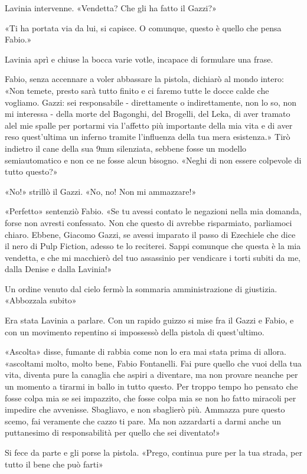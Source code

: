 Lavinia intervenne. «Vendetta? Che gli ha fatto il Gazzi?»

«Ti ha portata via da lui, si capisce. O comunque, questo è quello che pensa Fabio.» 

Lavinia aprì e chiuse la bocca varie votle, incapace di formulare una frase.

Fabio, senza accennare a voler abbassare la pistola, dichiarò al mondo intero: «Non temete, presto sarà tutto finito e ci faremo tutte le docce calde che vogliamo. Gazzi: sei responsabile - direttamente o indirettamente, non lo so, non mi interessa - della morte del Bagonghi, del Brogelli, del Leka, di aver tramato alel mie spalle per portarmi via l'affetto più importante della mia vita e di aver reso quest'ultima un inferno tramite l'influenza della tua mera esistenza.» Tirò indietro il cane della sua 9mm silenziata, sebbene fosse un modello semiautomatico e non ce ne fosse alcun bisogno. «Neghi di non essere colpevole di tutto questo?»

«No!» strillò il Gazzi. «No, no! Non mi ammazzare!»

«Perfetto» sentenziò Fabio. «Se tu avessi contato le negazioni nella mia domanda, forse non avresti confessato. Non che questo di avrebbe risparmiato, parliamoci chiaro. Ebbene, Giacomo Gazzi, se avessi imparato il passo di Ezechiele che dice il nero di Pulp Fiction, adesso te lo reciterei. Sappi comunque che questa è la mia vendetta, e che mi macchierò del tuo assassinio per vendicare i torti subiti da me, dalla Denise e dalla Lavinia!»

Un ordine venuto dal cielo fermò la sommaria amministrazione di giustizia. «Abbozzala subito»

Era stata Lavinia a parlare. Con un rapido guizzo si mise fra il Gazzi e Fabio, e con un movimento repentino si impossessò della pistola di quest'ultimo.

«Ascolta» disse, fumante di rabbia come non lo era mai stata prima di allora. «ascoltami molto, molto bene, Fabio Fontanelli. Fai pure quello che vuoi della tua vita, diventa pure la canaglia che aspiri a diventare, ma non provare neanche per un momento a tirarmi in ballo in tutto questo. Per troppo tempo ho pensato che fosse colpa mia se sei impazzito, che fosse colpa mia se non ho fatto miracoli per impedire che avvenisse. Sbagliavo, e non sbaglierò più. Ammazza pure questo scemo, fai veramente che cazzo ti pare. Ma non azzardarti a darmi anche un puttanesimo di responsabilità per quello che sei diventato!»

Si fece da parte e gli porse la pistola. «Prego, continua pure per la tua strada, per tutto il bene che può farti»

